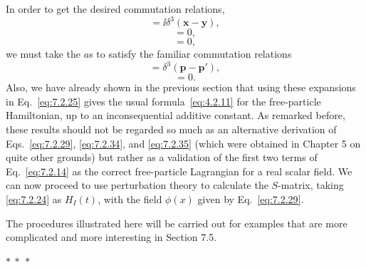 In order to get the desired commutation relations,
\begin{equation}
[\phi(\mathbf{x},t),\pi(\mathbf{y},t)]=\ii\delta^3(\mathbf{x}-\mathbf{y}),
\tag{7.2.31}\label{eq:7.2.31}
\end{equation}
\begin{equation}
[\phi(\mathbf{x},t),\phi(\mathbf{y},t)]=0,
\tag{7.2.32}\label{eq:7.2.32}
\end{equation}
\begin{equation}
[\pi(\mathbf{x},t),\pi(\mathbf{y},t)]=0,
\tag{7.2.33}\label{eq:7.2.33}
\end{equation}
we must take the $a$s to satisfy the familiar commutation relations
\begin{equation}
[a_{\mathbf{p}},a^\dagger_{\mathbf{p}'}]=\delta^3(\mathbf{p}-\mathbf{p}'),
\tag{7.2.34}\label{eq:7.2.34}
\end{equation}
\begin{equation}
[a_{\mathbf{p}},a_{\mathbf{p}'}]=0.
\tag{7.2.35}\label{eq:7.2.35}
\end{equation}
Also, we have already shown in the previous section that using these
expansions in Eq.~\eqref{eq:7.2.25} gives the usual formula~\eqref{eq:4.2.11} for the
free-particle Hamiltonian, up to an inconsequential additive constant. As
remarked before, these results should not be regarded so much as an
alternative derivation of Eqs.~\eqref{eq:7.2.29}, \eqref{eq:7.2.34}, and \eqref{eq:7.2.35} (which were
obtained in Chapter 5 on quite other grounds) but rather as a validation
of the first two terms of Eq.~\eqref{eq:7.2.14} as the correct free-particle Lagrangian
for a real scalar field. We can now proceed to use perturbation theory to
calculate the $S$-matrix, taking \eqref{eq:7.2.24} as $H_I(t)$, with the field $\phi(x)$ given
by Eq.~\eqref{eq:7.2.29}.

The procedures illustrated here will be carried out for examples that
are more complicated and more interesting in Section 7.5.

\begin{center}
$*\ *\ *$
\end{center}

